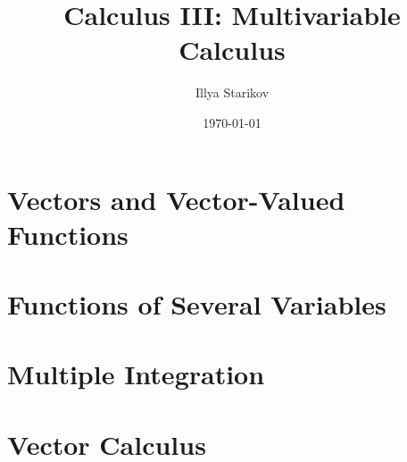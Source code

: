 \documentclass[12pt]{article}
\title{Calculus III: Multivariable Calculus}
\author{Illya Starikov}
\date{\today}
\begin{document}
\maketitle
\tableofcontents\pagebreak


\section{Vectors and Vector-Valued Functions}










\section{Functions of Several Variables}










\section{Multiple Integration}







\section{Vector Calculus}








\end{document}
